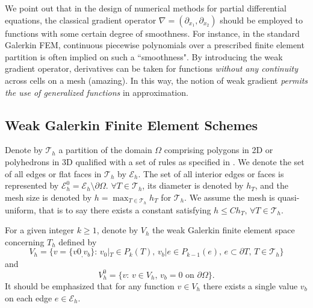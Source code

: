 	\begin{remark}
	We point out that in the design	of numerical methods for partial 
	differential equations, the classical 
	gradient operator $\nabla=(\partial_{x_1},\partial_{x_2})$ should be 
	employed to functions with some certain degree of smoothness.
	For instance, in the standard Galerkin FEM, continuous piecewise 
	polynomials over a prescribed finite element partition is often implied on 
	such a ``smoothness". By introducing the weak gradient operator, 
	derivatives can be taken for functions \emph{without 
	any	continuity} across cells on a mesh (amazing). In this way, the 
	notion of weak gradient \emph{permits the use of generalized functions}
	in approximation.
	\end{remark}

	\subsection{Weak Galerkin Finite Element Schemes}
	Denote by $\mathcal{T}_h$ a partition of the domain $\Omega$ comprising 
	polygons in 2D or polyhedrons in 3D qualified with a set of rules as 
	specified in \cite{WGmixed2014}. We denote the set of all 
	edges or flat faces in $\mathcal{T}_h$ by $\mathcal{E}_h$.
	The set of all interior edges or faces is represented by 
	$\mathcal{E}_h^0=\mathcal{E}_h\setminus\partial\Omega$.
	$\forall T\in\mathcal{T}_h$, its diameter
	is denoted by $h_T$, and the mesh size is denoted by
	$h=\max_{T\in\mathcal{T}_h} h_T$ for $\mathcal{T}_h$.
	We assume the mesh is quasi-uniform, that is to say there exists a 
	constant satisfying $h\leq Ch_T,\,\forall T\in\mathcal{T}_h$.
	
	For a given integer $k\geq 1$, denote by $V_h$ the weak Galerkin finite 
	element space concerning $T_h$ defined by
	\begin{equation}
		V_h=\{v=\{v0_,v_b\}:\,v_0|_T\in P_k(T),\,v_b|e\in P_{k-1}(e),\,
		e\subset\partial T,\,T\in\mathcal{T}_h \}
	\end{equation}
	and
	\begin{equation}
		V_h^0=\{v:\,v\in V_h,\, v_b=0 \textrm{ on } \partial\Omega\}.
	\end{equation}
	It should be emphasized that for any function $v\in V_h$ there exists a 
	single value $v_b$ on each edge $e\in\mathcal{E}_h$.
	
